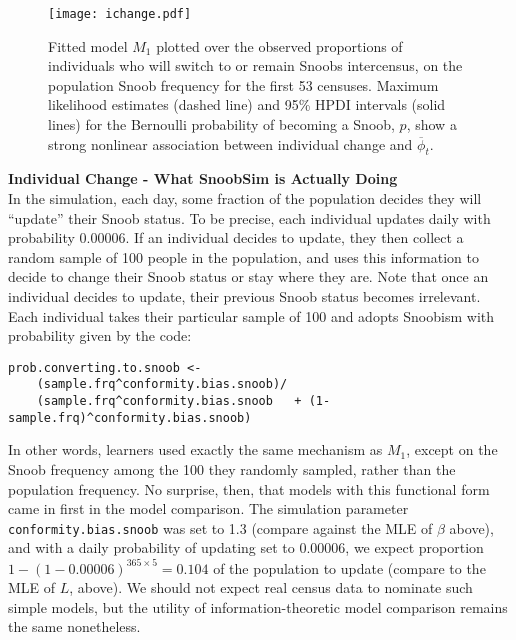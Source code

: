 \documentclass[11pt]{article}
\begin{document}
\begin{figure}[t]
\begin{center}
\texttt{[image: ichange.pdf]}
\caption{Fitted model $M_1$ plotted over the observed proportions of individuals who will switch to or remain Snoobs intercensus, on the population Snoob frequency for the first 53 censuses.  Maximum likelihood estimates (dashed line) and 95\% HPDI intervals (solid lines) for the Bernoulli probability of becoming a Snoob, $p$, show a strong nonlinear association between individual change and $\overline{\phi}_t$.}
\label{fig:ichange}
\end{center}
\end{figure}





\newpage
\textbf{Individual Change - What SnoobSim is Actually Doing}\\

In the simulation, each day, some fraction of the population decides they will ``update'' their Snoob status.  To be precise, each individual updates daily with probability 0.00006.  If an individual decides to update, they then collect a random sample of 100 people in the population, and uses this information to decide to change their Snoob status or stay where they are.  Note that once an individual decides to update, their previous Snoob status becomes irrelevant.  Each individual takes their particular sample of 100 and adopts Snoobism with probability given by the code:

\begin{verbatim}
prob.converting.to.snoob <- 
	(sample.frq^conformity.bias.snoob)/
	(sample.frq^conformity.bias.snoob	+ (1-sample.frq)^conformity.bias.snoob)
\end{verbatim}

In other words, learners used exactly the same mechanism as $M_1$, except on the Snoob frequency among the 100 they randomly sampled, rather than the population frequency.  No surprise, then, that models with this functional form came in first in the model comparison.  The simulation parameter \texttt{conformity.bias.snoob} was set to 1.3 (compare against the MLE of $\beta$ above), and with a daily probability of updating set to 0.00006, we expect proportion $1-(1-0.00006)^{365\times5}=0.104$ of the population to update (compare to the MLE of $L$, above).  We should not expect real census data to nominate such simple models, but the utility of information-theoretic model comparison remains the same nonetheless.
\end{document}
